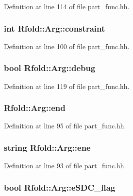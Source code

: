 Definition at line 114 of file part\+\_\+func.\+hh.

\hypertarget{class_rfold_1_1_arg_ab05512b7f96ce930ac13b873e7c298b1}{
\subsubsection[{constraint}]{\setlength{\rightskip}{0pt plus 5cm}int Rfold\+::\+Arg\+::constraint}}\label{class_rfold_1_1_arg_ab05512b7f96ce930ac13b873e7c298b1}


Definition at line 100 of file part\+\_\+func.\+hh.

\hypertarget{class_rfold_1_1_arg_ad6f2d65fd94879a530699ee4680e5d63}{
\subsubsection[{debug}]{\setlength{\rightskip}{0pt plus 5cm}bool Rfold\+::\+Arg\+::debug}}\label{class_rfold_1_1_arg_ad6f2d65fd94879a530699ee4680e5d63}


Definition at line 119 of file part\+\_\+func.\+hh.

\hypertarget{class_rfold_1_1_arg_ad5641c6dff38e98a3dadb60223a4b630}{
\subsubsection[{end}]{ Rfold\+::\+Arg\+::end}}\label{class_rfold_1_1_arg_ad5641c6dff38e98a3dadb60223a4b630}


Definition at line 95 of file part\+\_\+func.\+hh.

\hypertarget{class_rfold_1_1_arg_a3fc1f86f5f3f7b2572392b547a2ef6a9}{
\subsubsection[{ene}]{\setlength{\rightskip}{0pt plus 5cm}string Rfold\+::\+Arg\+::ene}}\label{class_rfold_1_1_arg_a3fc1f86f5f3f7b2572392b547a2ef6a9}


Definition at line 93 of file part\+\_\+func.\+hh.

\hypertarget{class_rfold_1_1_arg_addf5237deb4bf9025fa747fbd2c33366}{
\subsubsection[{e\+S\+D\+C\+\_\+flag}]{\setlength{\rightskip}{0pt plus 5cm}bool Rfold\+::\+Arg\+::e\+S\+D\+C\+\_\+flag}}\label{class_rfold_1_1_arg_addf5237deb4bf9025fa747fbd2c33366}


